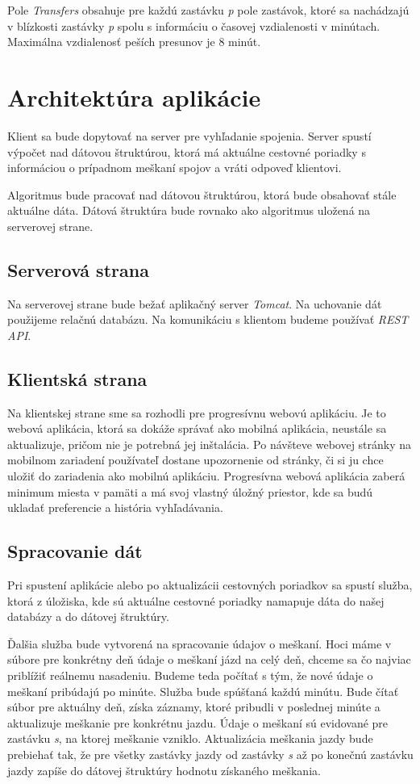 Pole \textit{Transfers} obsahuje pre každú zastávku \textit{p} pole zastávok, ktoré sa nachádzajú v blízkosti zastávky \textit{p} spolu s informáciu o časovej vzdialenosti v minútach. Maximálna vzdialenosť peších presunov je 8 minút. 


\section{Architektúra aplikácie}

Klient sa bude dopytovať na server pre vyhľadanie spojenia. Server spustí výpočet nad dátovou štruktúrou, ktorá má aktuálne cestovné poriadky s informáciou o prípadnom meškaní spojov a vráti odpoveď klientovi.

Algoritmus bude pracovať nad dátovou štruktúrou, ktorá bude obsahovať stále aktuálne dáta. Dátová štruktúra bude rovnako ako algoritmus uložená na serverovej strane. 

\subsection{Serverová strana}
Na serverovej strane bude bežať aplikačný server \textit{Tomcat}. Na uchovanie dát použijeme relačnú databázu. Na komunikáciu s klientom budeme používať \textit{REST API}.

\subsection{Klientská strana}
Na klientskej strane sme sa rozhodli pre progresívnu webovú aplikáciu. Je to webová aplikácia, ktorá sa dokáže správať ako mobilná aplikácia, neustále sa aktualizuje, pričom nie je potrebná jej inštalácia. Po návšteve webovej stránky na mobilnom zariadení používateľ dostane upozornenie od stránky, či si ju chce uložiť do zariadenia ako mobilnú aplikáciu. Progresívna webová aplikácia zaberá minimum miesta v pamäti a má svoj vlastný úložný priestor, kde sa budú ukladať preferencie a história vyhľadávania.

\subsection{Spracovanie dát}
Pri spustení aplikácie alebo po aktualizácii cestovných poriadkov sa spustí služba, ktorá z úložiska, kde sú aktuálne cestovné poriadky namapuje dáta do našej databázy a do dátovej štruktúry. 

Ďalšia služba bude vytvorená na spracovanie údajov o meškaní. Hoci máme v súbore pre konkrétny deň údaje o meškaní jázd na celý deň, chceme sa čo najviac priblížiť reálnemu nasadeniu. Budeme teda počítať s tým, že nové údaje o meškaní pribúdajú po minúte. Služba bude spúšťaná každú minútu. Bude čítať súbor pre aktuálny deň, získa záznamy, ktoré pribudli v poslednej minúte a aktualizuje meškanie pre konkrétnu jazdu. Údaje o meškaní sú evidované pre zastávku \textit{s}, na ktorej meškanie vzniklo. Aktualizácia meškania jazdy bude prebiehať tak, že pre všetky zastávky jazdy od zastávky \textit{s} až po konečnú zastávku jazdy zapíše do dátovej štruktúry hodnotu získaného meškania.

